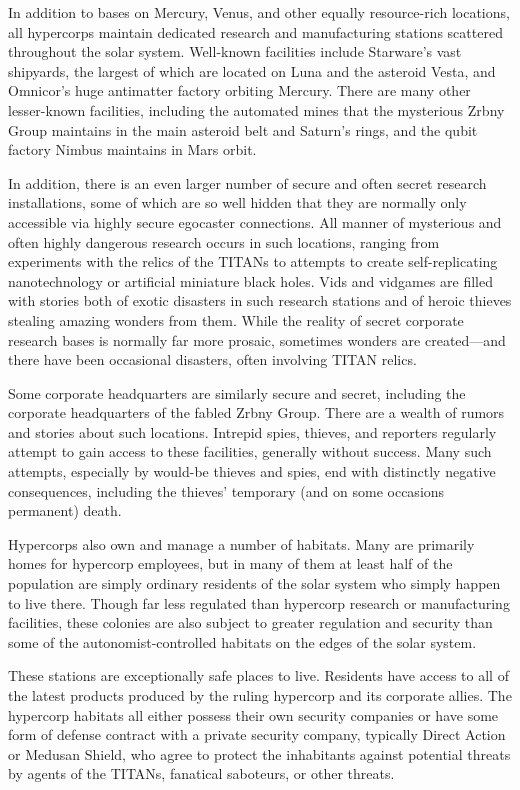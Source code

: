 In addition to bases on Mercury, Venus, and other equally resource-rich locations, all hypercorps maintain dedicated research and manufacturing stations scattered throughout the solar system. Well-known facilities include Starware's vast shipyards, the largest of which are located on Luna and the asteroid Vesta, and Omnicor's huge antimatter factory orbiting Mercury. There are many other lesser-known facilities, including the automated mines that the mysterious Zrbny Group maintains in the main asteroid belt and Saturn's rings, and the qubit factory Nimbus maintains in Mars orbit. 

In addition, there is an even larger number of secure and often secret research installations, some of which are so well hidden that they are normally only accessible via highly secure egocaster connections. All manner of mysterious and often highly dangerous research occurs in such locations, ranging from experiments with the relics of the TITANs to attempts to create self-replicating nanotechnology or artificial miniature black holes. Vids and vidgames are filled with stories both of exotic disasters in such research stations and of heroic thieves stealing amazing wonders from them. While the reality of secret corporate research bases is normally far more prosaic, sometimes wonders are created—and there have been occasional disasters, often involving TITAN relics. 

Some corporate headquarters are similarly secure and secret, including the corporate headquarters of the fabled Zrbny Group. There are a wealth of rumors and stories about such locations. Intrepid spies, thieves, and reporters regularly attempt to gain access to these facilities, generally without success. Many such attempts, especially by would-be thieves and spies, end with distinctly negative consequences, including the thieves' temporary (and on some occasions permanent) death. 

Hypercorps also own and manage a number of habitats. Many are primarily homes for hypercorp employees, but in many of them at least half of the population are simply ordinary residents of the solar system who simply happen to live there. Though far less regulated than hypercorp research or manufacturing facilities, these colonies are also subject to greater regulation and security than some of the autonomist-controlled habitats on the edges of the solar system. 

These stations are exceptionally safe places to live. Residents have access to all of the latest products produced by the ruling hypercorp and its corporate allies. The hypercorp habitats all either possess their own security companies or have some form of defense contract with a private security company, typically Direct Action or Medusan Shield, who agree to protect the inhabitants against potential threats by agents of the TITANs, fanatical saboteurs, or other threats. 

